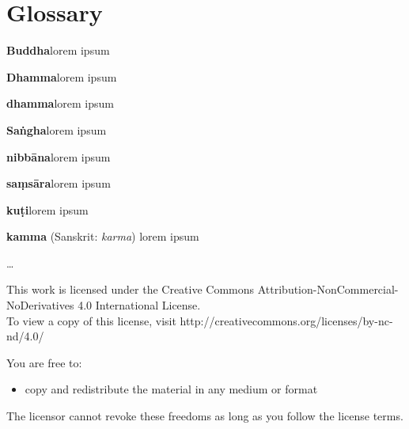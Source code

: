 \documentclass[11pt,openany]{memoir}
\begin{document}










\chapter*{Glossary}
\parindent 0pt
\parskip 4pt

\textbf{Buddha}\hspace{9pt}lorem ipsum

\textbf{Dhamma}\hspace{9pt}lorem ipsum

\textbf{dhamma}\hspace{9pt}lorem ipsum

\textbf{Saṅgha}\hspace{9pt}lorem ipsum

\textbf{nibbāna}\hspace{9pt}lorem ipsum

\textbf{saṃsāra}\hspace{9pt}lorem ipsum

\textbf{kuṭi}\hspace{9pt}lorem ipsum

\textbf{kamma}\hspace{9pt} (Sanskrit: \emph{karma}) lorem ipsum

\ldots{}

\clearpage
\mbox{}
\clearpage
\footnotesize
\begin{center}
This work is licensed under the Creative Commons
Attribution-NonCommercial-NoDerivatives 4.0 International License.\\To
view a copy of this license, visit
http://creativecommons.org/licenses/by-nc-nd/4.0/
\end{center}

You are free to:

\begin{itemize}
\item copy and redistribute the material in any medium or format 
\end{itemize}


The licensor cannot revoke these freedoms as long as you follow the
license terms.
\end{document}
